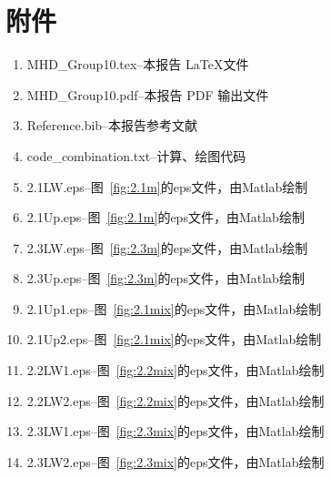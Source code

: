 \documentclass{article}
\begin{document}
\section{附件}

\begin{enumerate}
\item
MHD\_Group10.tex--本报告 \LaTeX 文件
\item
MHD\_Group10.pdf--本报告 PDF 输出文件
\item
Reference.bib--本报告参考文献
\item
code\_combination.txt--计算、绘图代码
\item
2.1LW.eps--图~\ref{fig:2.1m}的eps文件，由Matlab绘制
\item
2.1Up.eps--图~\ref{fig:2.1m}的eps文件，由Matlab绘制
\item
2.3LW.eps--图~\ref{fig:2.3m}的eps文件，由Matlab绘制
\item
2.3Up.eps--图~\ref{fig:2.3m}的eps文件，由Matlab绘制
\item
2.1Up1.eps--图~\ref{fig:2.1mix}的eps文件，由Matlab绘制
\item
2.1Up2.eps--图~\ref{fig:2.1mix}的eps文件，由Matlab绘制
\item
2.2LW1.eps--图~\ref{fig:2.2mix}的eps文件，由Matlab绘制
\item
2.2LW2.eps--图~\ref{fig:2.2mix}的eps文件，由Matlab绘制
\item
2.3LW1.eps--图~\ref{fig:2.3mix}的eps文件，由Matlab绘制
\item
2.3LW2.eps--图~\ref{fig:2.3mix}的eps文件，由Matlab绘制
\end{enumerate}
% 
% 
%

%



%
%

\end{document}

